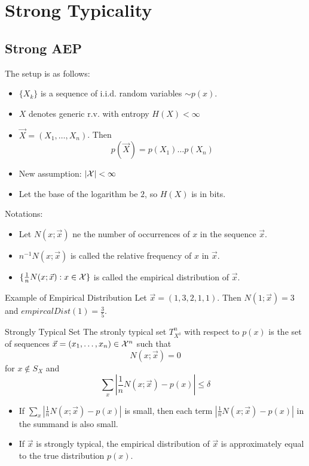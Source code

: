 \documentclass[../main.tex]{subfiles}
\begin{document}
\chapter{Strong Typicality}
\section{Strong AEP}
The setup is as follows: 
\begin{itemize}
    \item $\{X_k\}$ is a sequence of i.i.d. random variables $\sim p(x)$.
    \item $X$ denotes generic r.v. with entropy $H(X)<\infty$
    \item $\vec X=(X_1,\dots,X_n)$. Then \[
    p(\vec X) = p(X_1)\dots p(X_n)
    \]
    \item New assumption: $|\mathcal{X}| < \infty$
    \item Let the base of the logarithm be $2$, so $H(X)$ is in bits.
\end{itemize}
Notations:\begin{itemize}
    \item Let $N(x;\vec x)$ ne the number of occurrences of $x$ in the sequence $\vec x$.
    \item $n^{-1}N(x;\vec x)$ is called the relative frequency of $x$ in $\vec x$.
    \item $\{\frac{1}{n}N(x;\vec x): x\in\mathcal{X}\}$ is called the empirical distribution of $\vec x$.
\end{itemize}
\begin{pbox}{Example of Empirical Distribution}
    Let $\vec x=(1,3,2,1,1)$. Then $N(1;\vec x)=3$ and $empircalDist(1)=\frac{3}{5}$.
\end{pbox}
\begin{pbox}{Strongly Typical Set}
    The stronly typical set $T^{n}_{X^{\delta}}$ with respect to $p(x)$ is the set of sequences $\vec x=(x_1,\dots,x_n)\in \mathcal{X}^n$ such that \[
    N(x;\vec x)=0
    \] for $x\notin S_X$ and \[
    \sum_x|\frac{1}{n}N(x;\vec x)-p(x)|\leq \delta
    \]
    \begin{remark*}
        \begin{itemize}
            \item If $\sum_x|\frac{1}{n}N(x;\vec x)-p(x)|$ is small, then each term $|\frac{1}{n}N(x;\vec x)-p(x)|$ in the summand is also small.
            \item If $\vec x$ is strongly typical, the empirical distribution of $\vec x$ is approximately equal to the true distribution $p(x)$.
        \end{itemize}
    \end{remark*}
\end{pbox}
\end{document}
